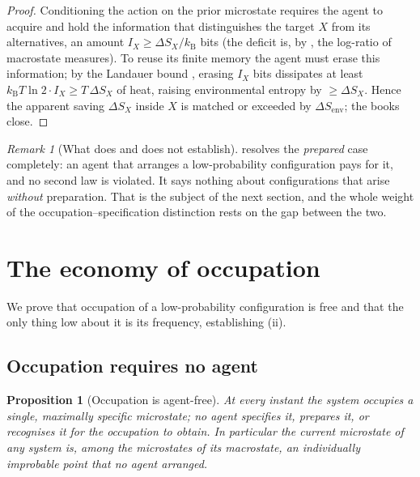 \documentclass[11pt,a4paper]{article}
\theoremstyle{thmstyle}
\newtheorem{proposition}[theorem]{Proposition}
\theoremstyle{definition}
\theoremstyle{remark}
\newtheorem{remark}[theorem]{Remark}
\newcommand{\kB}{k_{\mathrm{B}}}
\begin{document}
\begin{proof}
Conditioning the action on the prior microstate requires the agent to acquire
and hold the information that distinguishes the target $X$ from its alternatives,
an amount $I_X\ge\Delta S_X/\kB$ bits (the deficit is, by
, the log-ratio of macrostate measures). To reuse its
finite memory the agent must erase this information; by the Landauer bound
\citep{landauer1961,bennett1982}, erasing $I_X$ bits dissipates at least
$\kB T\ln 2\cdot I_X\ge T\,\Delta S_X$ of heat, raising environmental entropy by
$\ge\Delta S_X$. Hence the apparent saving $\Delta S_X$ inside $X$ is matched or
exceeded by $\Delta S_{\mathrm{env}}$; the books close.
\end{proof}

\begin{remark}[What  does and does not establish]
\label{rem:landauer-scope}
 resolves the \emph{prepared} case completely: an agent that
arranges a low-probability configuration pays for it, and no second law is
violated. It says nothing about configurations that arise \emph{without}
preparation. That is the subject of the next section, and the whole weight of
the occupation--specification distinction rests on the gap between the two.
\end{remark}

\section{The economy of occupation}
\label{sec:occ}

We prove that occupation of a low-probability configuration is free and that the
only thing low about it is its frequency, establishing (ii).

\subsection{Occupation requires no agent}

\begin{proposition}[Occupation is agent-free]
\label{prop:occ-free}
At every instant the system occupies a single, maximally specific microstate; no
agent specifies it, prepares it, or recognises it for the occupation to obtain.
In particular the current microstate of any system is, among the microstates of
its macrostate, an individually improbable point that no agent arranged.
\end{proposition}
\end{document}
